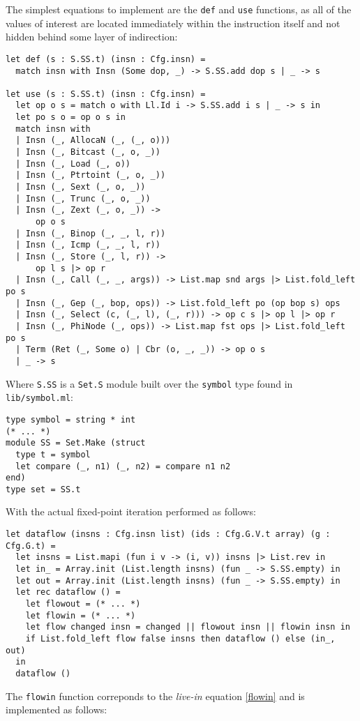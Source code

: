 \documentclass{article}
\begin{document}
The simplest equations to implement are the \lstinline!def! and \lstinline!use! functions, as all of the values of interest are located immediately within the instruction itself and not hidden behind some layer of indirection:
\begin{verbatim}
let def (s : S.SS.t) (insn : Cfg.insn) =
  match insn with Insn (Some dop, _) -> S.SS.add dop s | _ -> s

let use (s : S.SS.t) (insn : Cfg.insn) =
  let op o s = match o with Ll.Id i -> S.SS.add i s | _ -> s in
  let po s o = op o s in
  match insn with
  | Insn (_, AllocaN (_, (_, o)))
  | Insn (_, Bitcast (_, o, _))
  | Insn (_, Load (_, o))
  | Insn (_, Ptrtoint (_, o, _))
  | Insn (_, Sext (_, o, _))
  | Insn (_, Trunc (_, o, _))
  | Insn (_, Zext (_, o, _)) ->
      op o s
  | Insn (_, Binop (_, _, l, r))
  | Insn (_, Icmp (_, _, l, r))
  | Insn (_, Store (_, l, r)) ->
      op l s |> op r
  | Insn (_, Call (_, _, args)) -> List.map snd args |> List.fold_left po s
  | Insn (_, Gep (_, bop, ops)) -> List.fold_left po (op bop s) ops
  | Insn (_, Select (c, (_, l), (_, r))) -> op c s |> op l |> op r
  | Insn (_, PhiNode (_, ops)) -> List.map fst ops |> List.fold_left po s
  | Term (Ret (_, Some o) | Cbr (o, _, _)) -> op o s
  | _ -> s
\end{verbatim}
Where \lstinline!S.SS! is a \lstinline!Set.S! module built over the \lstinline!symbol! type found in \lstinline!lib/symbol.ml!:
\begin{verbatim}
type symbol = string * int
(* ... *)
module SS = Set.Make (struct
  type t = symbol
  let compare (_, n1) (_, n2) = compare n1 n2
end)
type set = SS.t
\end{verbatim}
With the actual fixed-point iteration performed as follows:
\begin{verbatim}
let dataflow (insns : Cfg.insn list) (ids : Cfg.G.V.t array) (g : Cfg.G.t) =
  let insns = List.mapi (fun i v -> (i, v)) insns |> List.rev in
  let in_ = Array.init (List.length insns) (fun _ -> S.SS.empty) in
  let out = Array.init (List.length insns) (fun _ -> S.SS.empty) in
  let rec dataflow () =
    let flowout = (* ... *)
    let flowin = (* ... *)
    let flow changed insn = changed || flowout insn || flowin insn in
    if List.fold_left flow false insns then dataflow () else (in_, out)
  in
  dataflow ()
\end{verbatim}
The \texttt{flowin} function correponds to the \textit{live-in} equation \eqref{flowin} and is implemented as follows:
\end{document}
